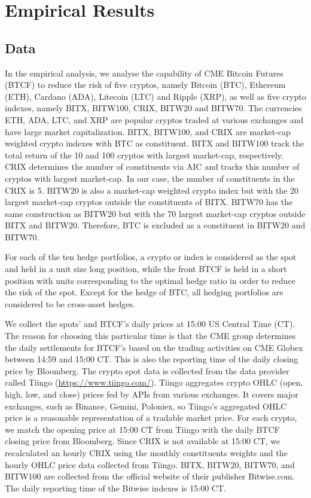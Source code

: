 \section{Empirical Results}\label{sec:results}

\subsection{Data}\label{subsec:data}
In the empirical analysis, we analyse the capability 
of CME Bitcoin Futures (BTCF) to reduce the risk of
five cryptos, namely Bitcoin (BTC), Ethereum 
(ETH), Cardano (ADA), Litecoin (LTC) and Ripple (XRP), as well as five
crypto indexes, namely BITX, BITW100, CRIX, BITW20 and BITW70.
The currencies ETH, ADA, LTC, and XRP are popular cryptos traded at
various exchanges and have large market capitalization. 
BITX, BITW100, and CRIX are market-cap weighted crypto indexes with
BTC as constituent. 
BITX and BITW100 track the total return of the 10 and 100 cryptos
with largest market-cap, respectively. 
CRIX determines the number of constituents via AIC and tracks this
number of cryptos with largest market-cap. In our case, the number of
constituents in the CRIX is 5. 
BITW20 is also a market-cap weighted crypto index but with the 20
largest market-cap cryptos outside the constituents of BITX.
BITW70 has the same construction as BITW20 but with the 70 largest
market-cap cryptos outside BITX and BITW20. 
Therefore, BTC is excluded as a constituent in BITW20 and BITW70.

For each of the ten hedge portfolios, a crypto or index is considered
as the spot and held in a unit size long position, while 
the front BTCF is held in a short position with units corresponding to
the optimal hedge ratio in order to reduce the risk of the spot. 
Except for the hedge of BTC, all hedging portfolios are considered to
be cross-asset hedges. 

We collect the spots' and BTCF's daily prices at 15:00 US Central Time
(CT). The reason for choosing this particular time is that the CME
group determines the daily settlements for BTCF's based on the trading
activities on CME Globex between 14:59 and 15:00 CT. This is also the
reporting time of the daily closing price by Bloomberg. 
The crypto spot data is collected from the data provider called
Tiingo (\href{https://www.tiingo.com/}{https://www.tiingo.com/}).
Tiingo aggregates crypto OHLC (open, high, low, and close) prices fed
by APIs from various exchanges. It covers major exchanges, such as
Binance, Gemini, Poloniex, so Tiingo's aggregated OHLC price is a
reasonable representation of a tradable market price. 
For each crypto, we match the opening price at 15:00 CT from Tiingo
with the daily BTCF closing price from Bloomberg.
Since CRIX is not available at 15:00 CT, we recalculated an hourly
CRIX using the monthly constituents weights and the hourly OHLC price
data collected from Tiingo. 
BITX, BITW20, BITW70, and BITW100 are collected from the official
website of their publisher Bitwise.com. 
The daily reporting time of the Bitwise indexes is 15:00 CT.

